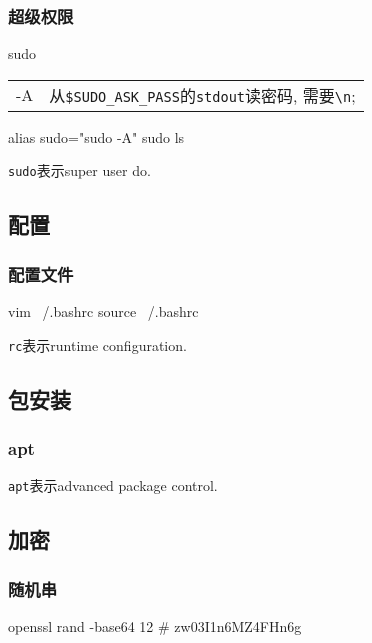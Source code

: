 \documentclass[hidelinks]{ctexart}
\begin{document}

\subsubsection{超级权限} %
\label{ssub:超级权限}

\begin{shcommand}{sudo}
\ttfamily
\begin{tabular}{@{$\bullet\quad$}ll}
   -A      & 从\texttt{\$SUDO\_ASK\_PASS}的\texttt{stdout}读密码, 需要\texttt{\textbackslash n};
\end{tabular} 
\end{shcommand}
\begin{shlst}
alias sudo="sudo -A"
sudo ls
\end{shlst}
\texttt{sudo}表示super user do.



\subsection{配置} %
\label{sub:配置}

\subsubsection{配置文件} %
\label{ssub:配置文件}

\begin{shlst}
vim ~/.bashrc
source ~/.bashrc
\end{shlst}
\texttt{rc}表示runtime configuration.



\subsection{包安装} %
\label{sub:包安装}

\subsubsection{apt} %
\label{ssub:apt}

\texttt{apt}表示advanced package control.



\subsection{加密} %
\label{sub:加密}

\subsubsection{随机串} %
\label{ssub:随机串}

\begin{shlst}
openssl rand -base64 12
# zw03I1n6MZ4FHn6g
\end{shlst}



\end{document}
